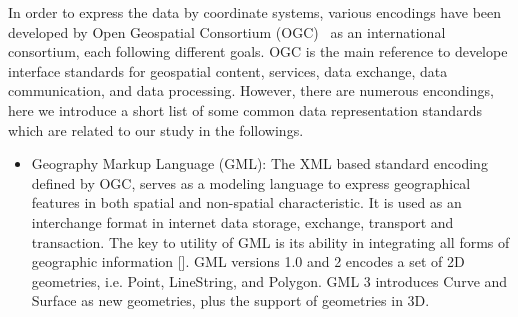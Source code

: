 \documentclass[a4paper,12pt]{article}
\begin{document}
In order to express the data by coordinate systems, various encodings have been developed by Open Geospatial Consortium (OGC)~\cite{ogc} as an international consortium, each following different goals. OGC is the main reference to develope interface standards for geospatial content, services, data exchange, data communication, and data processing. However, there are numerous encondings, here we introduce a short list of some common data representation standards which are related to our study in the followings.
\begin{itemize}


\item Geography Markup Language (GML): The XML based standard encoding defined by OGC, serves as a modeling language to express geographical features in both spatial and non-spatial characteristic. It is used as an interchange format in internet data storage, exchange, transport and transaction. The key to utility of GML is its ability in integrating all forms of geographic information []. %
GML versions 1.0 and 2 encodes a set of 2D geometries, i.e. Point, LineString, and Polygon. GML 3 introduces Curve and Surface as new geometries, plus the support of geometries in 3D.


\end{itemize}
\end{document}
